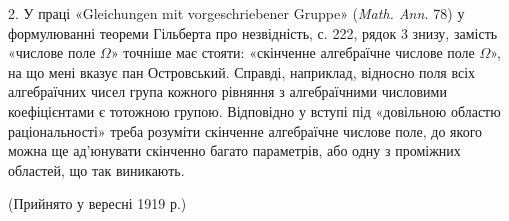 \documentclass[11pt]{article}
\begin{document}
2. У праці «Gleichungen mit vorgeschriebener Gruppe» (\emph{Math. Ann.} 78) у формулюванні теореми Гільберта про незвідність, с. 222, рядок 3 знизу, замість «числове поле \(\Omega\)» точніше має стояти: «скінченне алгебраїчне числове поле \(\Omega\)», на що мені вказує пан Островський. Справді, наприклад, відносно поля всіх алгебраїчних чисел група кожного рівняння з алгебраїчними числовими коефіцієнтами є тотожною групою. Відповідно у вступі під «довільною областю раціональності» треба розуміти скінченне алгебраїчне числове поле, до якого можна ще ад'юнувати скінченно багато параметрів, або одну з проміжних областей, що так виникають.

\begin{center}
(Прийнято у вересні 1919 р.)
\end{center}
\end{document}
